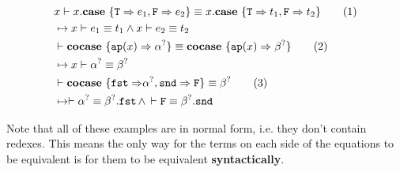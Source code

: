 \documentclass[twoside,12pt,a4paper]{article}
\begin{document}
\begin{example}
    \begin{align*}
    &x\vdash x.\textbf{case}\ \{\texttt{T} \Rightarrow e_1, \texttt{F} \Rightarrow e_2\} \equiv x.\textbf{case}\ \{\texttt{T} \Rightarrow t_1, \texttt{F} \Rightarrow t_2\}\tag{1}
    \\ &\mapsto x\vdash  e_1 \equiv t_1\wedge x\vdash e_2\equiv t_2\\
    &\vdash \textbf{cocase}\ \{\texttt{ap}(x)\Rightarrow \alpha^?\} \equiv \textbf{cocase}\ \{\texttt{ap}(x)\Rightarrow\beta^?\} \tag{2}
    \\ &\mapsto x\vdash \alpha^? \equiv \beta^?\\
    &\vdash\textbf{cocase}\ \{\mathtt{fst \Rightarrow} \alpha^?, \mathtt{snd\Rightarrow F}\}\equiv \beta^? \tag{3}
    \\ &\mapsto \vdash \alpha^?\equiv \beta^?.\mathtt{fst}\, \wedge \,\vdash \mathtt{F\equiv\beta^?.snd}
    \end{align*}
\end{example}
Note that all of these examples are in normal form, i.e. they don't contain redexes.
This means the only way for the terms on each side of the equations to be equivalent
is for them to be equivalent \textbf{syntactically}. 
\end{document}
